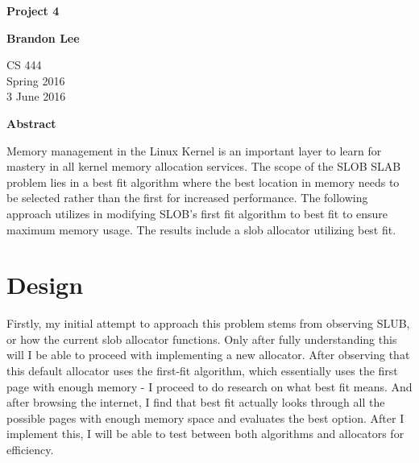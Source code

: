 \documentclass[letterpaper,10pt,titlepage]{article}
\begin{document}
\begin{titlepage}
    \begin{center}
        \vspace*{3.5cm}

        \textbf{Project 4}

        \vspace{0.5cm}

        \textbf{Brandon Lee}

        \vspace{0.8cm}

        CS 444\\
        Spring 2016\\
        3 June 2016\\

        \vspace{1cm}

        \textbf{Abstract}\\

        \vspace{0.5cm}

        Memory management in the Linux Kernel is an important layer to learn for mastery in all kernel memory allocation services. The scope of the SLOB SLAB problem lies in a best fit algorithm where the best location in memory needs to be selected rather than the first for increased performance. The following approach utilizes in modifying SLOB's first fit algorithm to best fit to ensure maximum memory usage. The results include a slob allocator utilizing best fit.


        \vfill



    \end{center}
\end{titlepage}

\newpage

\section{Design}

Firstly, my initial attempt to approach this problem stems from observing SLUB, or how the current slob allocator functions. Only after fully understanding this will I be able to proceed with implementing a new allocator. After observing that this default allocator uses the first-fit algorithm, which essentially uses the first page with enough memory - I proceed to do research on what best fit means. And after browsing the internet, I find that best fit actually looks through all the possible pages with enough memory space and evaluates the best option. After I implement this, I will be able to test between both algorithms and allocators for efficiency.
\end{document}
